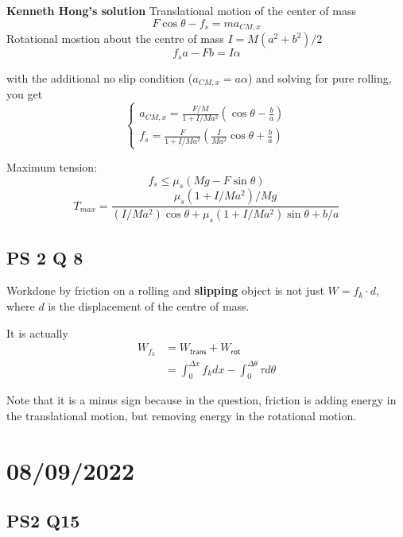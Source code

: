 \textbf{Kenneth Hong's solution}
Translational motion of the center of mass
\begin{equation}
    F \cos \theta - f_s= ma_{CM,x}
\end{equation}
Rotational mostion about the centre of mass $I=M(a^2+b^2)/2$
\begin{equation}
    f_s a - Fb=I\alpha
\end{equation}

with the additional no slip condition ($a_{CM,x}=a\alpha$) and solving for pure rolling, you get
\begin{equation}
    \begin{cases}
        a_{CM,x}=\frac{F/M}{1+I/Ma^2}(\cos\theta-\frac{b}{a})\\
        f_s=\frac{F}{1+I/Ma^2}(\frac{I}{Ma^2}\cos\theta+\frac{b}{a})
      \end{cases}
\end{equation}

Maximum tension:
\begin{equation}
    f_s \leq \mu_s (Mg-F \sin\theta)
\end{equation}
\begin{equation}
    T_{max}=\frac{\mu_s (1+I/Ma^2)/Mg}{(I/Ma^2)\cos\theta+\mu_s(1+I/Ma^2)\sin\theta+b/a}
\end{equation}

\subsection{PS 2 Q 8}

\indent Workdone by friction on a rolling and \textbf{slipping} object is not just $W=f_k \cdot d$, where $d$ is the displacement of the centre of mass.

It is actually
\begin{align}
    W_{f_k} 
    &= W_{\textsf{trans}}+W_{\textsf{rot}}\\
    &= \int_0^{\Delta x} f_k dx - \int_0^{\Delta \theta} \tau d \theta 
\end{align}

Note that it is a minus sign because in the question, friction is adding energy in the translational motion, but removing energy in the rotational motion. 

\section{08/09/2022}
\subsection{PS2 Q15}

